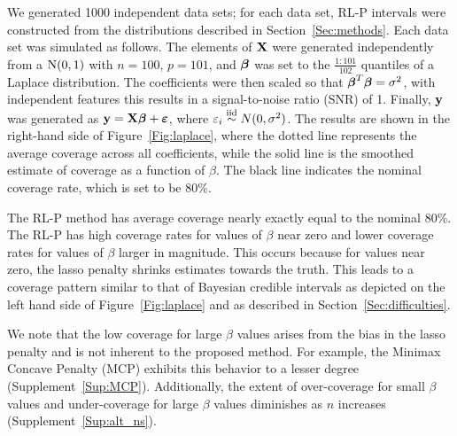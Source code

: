We generated 1000 independent data sets; for each data set, RL-P intervals were constructed from the distributions described in Section~\ref{Sec:methods}. Each data set was simulated as follows. The elements of $\mathbf{X}$ were generated independently from a $\textrm{N}(0, 1)$ with $n = 100$, $p = 101$, and $\boldsymbol{\beta}$ was set to the $\frac{1:101}{102}$ quantiles of a Laplace distribution. The coefficients were then scaled so that $\boldsymbol{\beta}^T\boldsymbol{\beta} = \sigma^2$, with independent features this results in a signal-to-noise ratio (SNR) of 1. Finally, $\mathbf{y}$ was generated as $\mathbf{y} = \mathbf{X}\boldsymbol{\beta} + \boldsymbol{\varepsilon}$, where $\varepsilon_i \overset{\text{iid}}{\sim} N(0, \sigma^2)$. The results are shown in the right-hand side of Figure~\ref{Fig:laplace}, where the dotted line represents the average coverage across all coefficients, while the solid line is the smoothed estimate of coverage as a function of $\beta$. The black line indicates the nominal coverage rate, which is set to be 80\%.



The RL-P method has average coverage nearly exactly equal to the nominal 80\%. The RL-P has high coverage rates for values of $\beta$ near zero and lower coverage rates for values of $\beta$ larger in magnitude. This occurs because for values near zero, the lasso penalty shrinks estimates towards the truth. This leads to a coverage pattern similar to that of Bayesian credible intervals as depicted on the left hand side of Figure~\ref{Fig:laplace} and as described in Section~\ref{Sec:difficulties}.

We note that the low coverage for large $\beta$ values arises from the bias in the lasso penalty and is not inherent to the proposed method. For example, the Minimax Concave Penalty (MCP) exhibits this behavior to a lesser degree (Supplement~\ref{Sup:MCP}). Additionally, the extent of over-coverage for small $\beta$ values and under-coverage for large $\beta$ values diminishes as $n$ increases (Supplement~\ref{Sup:alt_ns}).

